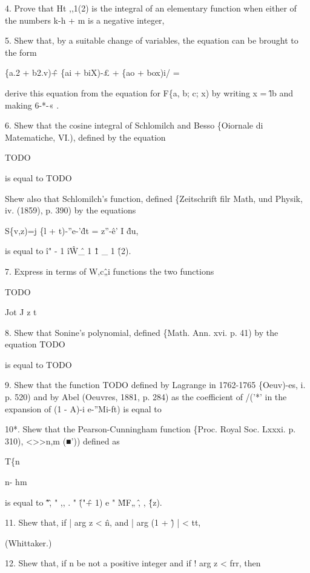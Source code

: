 4. Prove that Ht ,,1(2) is the integral of an elementary function when either of the 
numbers k-h + m is a negative integer, 

5. Shew that, by a suitable change of variables, the equation 
can be brought to the form 



\{a.2 + b2.v)\^ + \{ai + biX)-£ + \{ao + box)i/ = 



derive this equation from the equation for F\{a, b; c; x) by writing x = \^lb and making 
6-*-« . 

6. Shew that the cosine integral of Schlomilch and Besso \{Oiornale di Matematiche, 
VI.), defined by the equation 

TODO

is equal to TODO

Shew also that Schlomilch's function, defined \{Zeitschrift filr Math, und Physik, iv. 
(1859), p. 390) by the equations 

S\{v,z)=j \{l + t)-''e-'\^dt = z''-\^e' I \^du, 

is equal to \^i" - 1 \^i\^ W\^ \_ 1 \^ 1 \_ 1 \^ (2). 

7. Express in terms of W,c\^„i functions the two functions 

TODO

Jot J z t 

8. Shew that Sonine's polynomial, defined \{Math. Ann. xvi. p. 41) by the equation 
TODO

is equal to TODO

%
%

9. Shew that the function TODO defined by Lagrange in 1762-1765 \{Oeuv)-es, i. 
p. 520) and by Abel (Oeuvres, 1881, p. 284) as the coefficient of /('*' in the expansion of 
(1 - A)-i e-''Mi-ft) is eqnal to 

10*. Shew that the Pearson-Cunningham function \{Proc. Royal Soc. Lxxxi. p. 310), 
<>>n,m (■')) defined as 



T\{n 






n- hm 



is equal to \^ "\^, " ,, . " \^ ("\^ + 1) e " \^MF„ \^ , , \^ \{z). 

11. Shew that, if | arg z  < \^n, and | arg (1 + \^) | < tt, 

(Whittaker.) 

12. Shew that, if n be not a positive integer and if ! arg z  < frr, then 

